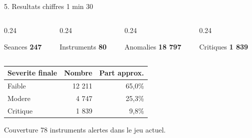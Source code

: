 \documentclass[aspectratio=169,10pt]{beamer}
\newcommand{\duration}[1]{\hfill{\scriptsize\color{bvcgold}#1}}
\newcommand{\metric}[3]{%
  \begin{block}{#1}
    {\Large\bfseries #2}\par\vspace{0.15em}{\scriptsize #3}
  \end{block}
}
\begin{document}
\begin{frame}{5. Resultats chiffres \duration{1 min 30}}
  \begin{columns}[T,onlytextwidth]
    \begin{column}{0.24\textwidth}
      \metric{Seances}{247}{Annee 2025}
    \end{column}
    \begin{column}{0.24\textwidth}
      \metric{Instruments}{80}{Univers analyse}
    \end{column}
    \begin{column}{0.24\textwidth}
      \metric{Anomalies}{18 797}{Toutes severites}
    \end{column}
    \begin{column}{0.24\textwidth}
      \metric{Critiques}{1 839}{Alertes prioritaires}
    \end{column}
  \end{columns}
  \vspace{0.65em}
  \small
  \begin{tabular}{lrr}
    \toprule
    Severite finale & Nombre & Part approx. \\
    \midrule
    Faible & 12 211 & 65,0\% \\
    Modere & 4 747 & 25,3\% \\
    Critique & 1 839 & 9,8\% \\
    \bottomrule
  \end{tabular}
  \hfill
  \begin{minipage}{0.31\textwidth}
    \begin{block}{Couverture}
      78 instruments alertes dans le jeu actuel.
    \end{block}
  \end{minipage}
\end{frame}
\end{document}
